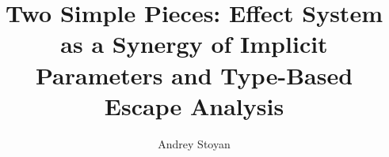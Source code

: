 \documentclass[acmsmall]{acmart}
\begin{document}
\title{Two Simple Pieces: Effect System as a Synergy of Implicit Parameters and Type-Based Escape Analysis}

%
%
%

\author{Andrey Stoyan}

\renewcommand{\shortauthors}{Andrey Stoyan}
\end{document}
